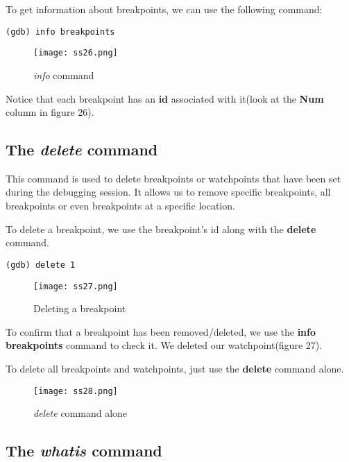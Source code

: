 \documentclass{article}
\makeatletter
\renewcommand\paragraph{\@startsection{paragraph}{4}{\z@}{-3.25ex \@plus -1ex \@minus -.2ex}{1.5ex \@plus .2ex}{\normalfont\normalsize\bfseries}}
\makeatother
\begin{document}
To get information about breakpoints, we can use the following command:
\begin{Verbatim}[frame=single]
(gdb) info breakpoints
\end{Verbatim}

\begin{figure}[h]
\centering
\texttt{[image: ss26.png]}
\caption{\textit{info} command}
\end{figure}

Notice that each breakpoint has an \textbf{id} associated with it(look at the \textbf{Num} column in figure 26).

\newpage
\subsection{The \textit{delete} command}
\paragraph{}
This command is used to delete breakpoints or watchpoints that have been set during the debugging session. It allows us to remove specific breakpoints, all breakpoints or even breakpoints at a specific location.

To delete a breakpoint, we use the breakpoint's id along with the \textbf{delete} command.

\begin{Verbatim}[frame=single]
(gdb) delete 1
\end{Verbatim}

\begin{figure}[h]
\centering
\texttt{[image: ss27.png]}
\caption{Deleting a breakpoint}
\end{figure}

To confirm that a breakpoint has been removed/deleted, we use the \textbf{info breakpoints} command to check it. We deleted our watchpoint(figure 27).

To delete all breakpoints and watchpoints, just use the \textbf{delete} command alone.

\begin{figure}[h]
\centering
\texttt{[image: ss28.png]}
\caption{\textit{delete} command alone}
\end{figure}

\newpage
\subsection{The \textit{whatis} command}
\end{document}
